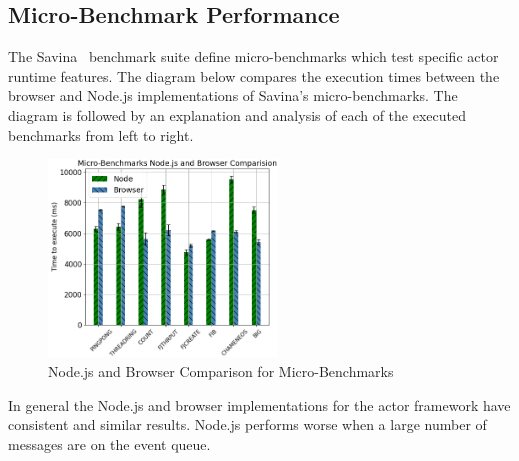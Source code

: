 \documentclass[lettersize,journal]{IEEEtran}
\begin{document}
\subsection{Micro-Benchmark Performance}
The Savina~\cite{savina} benchmark suite define micro-benchmarks which test specific actor runtime features. The diagram below compares the execution times between the browser and Node.js implementations of Savina's micro-benchmarks. The diagram is followed by an explanation and analysis of each of the executed benchmarks from left to right.
\begin{figure}[H]
    \begin{centering}
        \includegraphics[width=230px]{resources/micro.png}
        \caption{Node.js and Browser Comparison for Micro-Benchmarks}
    \end{centering}
\end{figure}
In general the Node.js and browser implementations for the actor framework have consistent and similar results. Node.js performs worse when a large number of messages are on the event queue.
\end{document}
